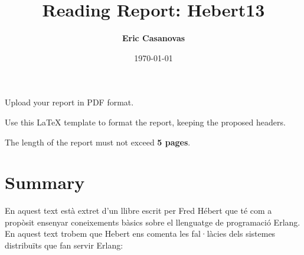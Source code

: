 \documentclass[a4paper, 10pt]{article}
\title{Reading Report: Hebert13}
\author{\textbf{Eric Casanovas}}
\date{\normalsize\today{}}
\begin{document}
\maketitle

\begin{center}
  Upload your report in PDF format.
  
  Use this LaTeX template to format the report, keeping the proposed headers.
  
	The length of the report must not exceed \textbf{5 pages}.
\end{center}

\section{Summary}

En aquest text està extret d'un llibre escrit per Fred Hébert que té com a propòsit ensenyar coneixements bàsics sobre el llenguatge de programació Erlang. \newline
\newline
En aquest text trobem que Hebert ens comenta les fal·làcies dels sistemes distribuïts que fan servir Erlang:
\end{document}
